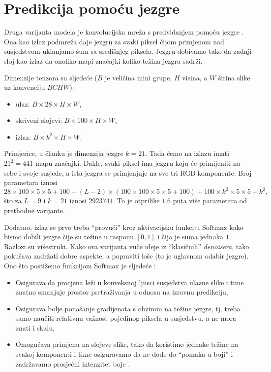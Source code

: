 \documentclass[times, utf8, seminar, numeric]{fer}
\begin{document}
\section{Predikcija pomoću jezgre}
Druga varijanta modela je konvolucijska mreža s predviđanjem pomoću jezgre
. Ona kao izlaz podmreža daje jezgru
 za svaki piksel čijom primjenom nad susjedstvom uklanjamo šum sa
središnjeg piksela. Jezgru dobivamo tako da zadnji sloj kao izlaz da onoliko mapi značajki
koliko težina jezgra sadrži.

Dimenzije tenzora su sljedeće ($B$ je veličina mini grupe, $H$ visina, a $W$ širina slike uz
konvenciju $BCHW$):
\begin{itemize}
\item ulaz: $B \times 28 \times H \times W$,
\item skriveni slojevi: $B \times 100 \times H \times W$,
\item izlaz: $B \times k^2 \times H \times W$.
\end{itemize}

Primjerice, u članku je dimenzija jezgre $k = 21$. Tada ćemo na izlazu imati $21^2 = 441$
mapu značajki. Dakle, svaki piksel ima jezgru koju će primijeniti na sebe i svoje susjede, a
ista jezgra se primjenjuje na sve tri RGB komponente.
Broj parametara iznosi
$$28\times100\times5\times5+100+(L-2)\times(100\times100\times5\times5+100)
+100\times k^2\times5\times5+k^2,$$
što za $L=9$ i $k=21$ iznosi $2923741$. To je otprilike $1.6$ puta više parametara od prethodne
varijante.

Dodatno, izlaz se prvo treba ``provući'' kroz aktivacijsku funkciju $\mathrm{Softmax}$ kako bismo
dobili jezgre čije su težine u rasponu $[0, 1]$ i čija je suma jednaka $1$. Razlozi su
višestruki. Kako ova varijanta vuče ideje iz ``klasičnih'' \textit{denoisera},
tako pokušava zadržati dobre aspekte, a popraviti loše (to je uglavnom odabir jezgre). Ono što
postižemo funkcijom $\mathrm{Softmax}$ je sljedeće \cite{Bako2017KPCN}:
\begin{itemize}
\item Osigurava da procjena leži u konveksnoj ljusci susjedstva ulazne slike i time znatno
  smanjuje prostor pretraživanja u odnosu na izravnu predikciju,
\item Osigurava bolje ponašanje gradijenata s obzirom na težine jezgre, tj. treba samo naučiti
  relativnu važnost pojedinog piksela u susjedstvu, a ne mora znati i skalu,
\item Omogućava primjenu na slojeve slike, tako da koristimo jednake težine na svakoj komponenti
  i time osiguravamo da ne dođe do ``pomaka u boji'' i zadržavamo prosječni intenzitet boje \cite{vogels2016thesis}.
\end{itemize}
\end{document}

